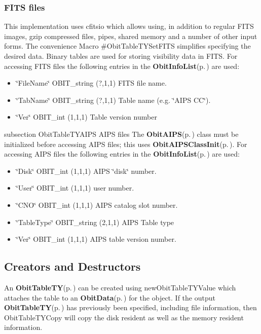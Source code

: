 \subsubsection{FITS files}\label{ObitTableWX_8h_TableFITS}
This implementation uses cfitsio which allows using, in addition to regular FITS images, gzip compressed files, pipes, shared memory and a number of other input forms. The convenience Macro \#Obit\-Table\-TYSet\-FITS simplifies specifying the desired data. Binary tables are used for storing visibility data in FITS. For accessing FITS files the following entries in the {\bf Obit\-Info\-List}{\rm (p.\,\pageref{structObitInfoList})} are used: \begin{itemize}
\item \char`\"{}File\-Name\char`\"{} OBIT\_\-string (?,1,1) FITS file name. \item \char`\"{}Tab\-Name\char`\"{} OBIT\_\-string (?,1,1) Table name (e.g. \char`\"{}AIPS CC\char`\"{}). \item \char`\"{}Ver\char`\"{} OBIT\_\-int (1,1,1) Table version number\end{itemize}
subsection Obit\-Table\-TYAIPS AIPS files The {\bf Obit\-AIPS}{\rm (p.\,\pageref{structObitAIPS})} class must be initialized before accessing AIPS files; this uses {\bf Obit\-AIPSClass\-Init}{\rm (p.\,\pageref{ObitAIPS_8c_a5})}. For accessing AIPS files the following entries in the {\bf Obit\-Info\-List}{\rm (p.\,\pageref{structObitInfoList})} are used: \begin{itemize}
\item \char`\"{}Disk\char`\"{} OBIT\_\-int (1,1,1) AIPS \char`\"{}disk\char`\"{} number. \item \char`\"{}User\char`\"{} OBIT\_\-int (1,1,1) user number. \item \char`\"{}CNO\char`\"{} OBIT\_\-int (1,1,1) AIPS catalog slot number. \item \char`\"{}Table\-Type\char`\"{} OBIT\_\-string (2,1,1) AIPS Table type \item \char`\"{}Ver\char`\"{} OBIT\_\-int (1,1,1) AIPS table version number.\end{itemize}
\subsection{Creators and Destructors}\label{ObitTableTY_8h_ObitTableTYaccess}
An {\bf Obit\-Table\-TY}{\rm (p.\,\pageref{structObitTableTY})} can be created using new\-Obit\-Table\-TYValue which attaches the table to an {\bf Obit\-Data}{\rm (p.\,\pageref{structObitData})} for the object. If the output {\bf Obit\-Table\-TY}{\rm (p.\,\pageref{structObitTableTY})} has previously been specified, including file information, then Obit\-Table\-TYCopy will copy the disk resident as well as the memory resident information.


